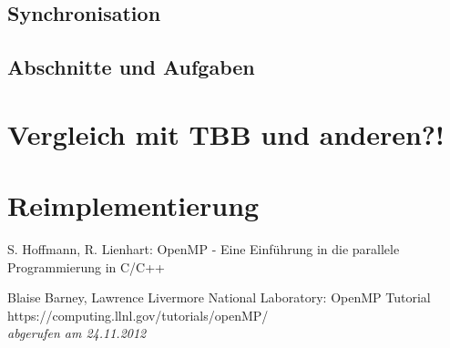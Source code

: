 \documentclass[11pt]{scrartcl}
\begin{document}
\subsection{Synchronisation} 

\subsection{Abschnitte und Aufgaben}

\pagebreak %

\section{Vergleich mit TBB und anderen?!}

\pagebreak %

\section{Reimplementierung}

\pagebreak %

\thispagestyle{empty}
\listoffigures

\listoftables

\lstlistoflistings

\begin{thebibliography}{3}
	 S. Hoffmann, R. Lienhart: OpenMP - Eine Einf{\"u}hrung in die parallele Programmierung in C/C++
	
	 Blaise Barney, Lawrence Livermore National Laboratory: OpenMP Tutorial \\ https://computing.llnl.gov/tutorials/openMP/ \\ \textit{abgerufen am 24.11.2012}
\end{thebibliography}
\end{document}

